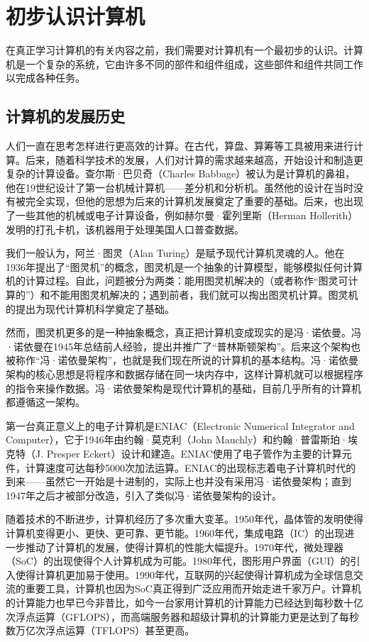 \chapter{初步认识计算机}

在真正学习计算机的有关内容之前，我们需要对计算机有一个最初步的认识。计算机是一个复杂的系统，它由许多不同的部件和组件组成，这些部件和组件共同工作以完成各种任务。

\section{计算机的发展历史}

人们一直在思考怎样进行更高效的计算。在古代，算盘、算筹等工具被用来进行计算。后来，随着科学技术的发展，人们对计算的需求越来越高，开始设计和制造更复杂的计算设备。查尔斯·巴贝奇（Charles Babbage）被认为是计算机的鼻祖，他在19世纪设计了第一台机械计算机——差分机和分析机。虽然他的设计在当时没有被完全实现，但他的思想为后来的计算机发展奠定了重要的基础。后来，也出现了一些其他的机械或电子计算设备，例如赫尔曼·霍列里斯（Herman Hollerith）发明的打孔卡机，该机器用于处理美国人口普查数据。

我们一般认为，阿兰·图灵（Alan Turing）是赋予现代计算机灵魂的人。他在1936年提出了“图灵机”的概念，图灵机是一个抽象的计算模型，能够模拟任何计算机的计算过程。自此，问题被分为两类：能用图灵机解决的（或者称作“图灵可计算的”）和不能用图灵机解决的；遇到前者，我们就可以掏出图灵机计算。图灵机的提出为现代计算机科学奠定了基础。

然而，图灵机更多的是一种抽象概念，真正把计算机变成现实的是冯·诺依曼。冯·诺依曼在1945年总结前人经验，提出并推广了“普林斯顿架构”。后来这个架构也被称作“冯·诺依曼架构”，也就是我们现在所说的计算机的基本结构。冯·诺依曼架构的核心思想是将程序和数据存储在同一块内存中，这样计算机就可以根据程序的指令来操作数据。冯·诺依曼架构是现代计算机的基础，目前几乎所有的计算机都遵循这一架构。

第一台真正意义上的电子计算机是ENIAC（Electronic Numerical Integrator and Computer），它于1946年由约翰·莫克利（John Mauchly）和约翰·普雷斯珀·埃克特（J. Presper Eckert）设计和建造。ENIAC使用了电子管作为主要的计算元件，计算速度可达每秒5000次加法运算。ENIAC的出现标志着电子计算机时代的到来——虽然它一开始是十进制的，实际上也并没有采用冯·诺依曼架构；直到1947年之后才被部分改造，引入了类似冯·诺依曼架构的设计。

随着技术的不断进步，计算机经历了多次重大变革。1950年代，晶体管的发明使得计算机变得更小、更快、更可靠、更节能。1960年代，集成电路（IC）的出现进一步推动了计算机的发展，使得计算机的性能大幅提升。1970年代，微处理器（SoC）的出现使得个人计算机成为可能。1980年代，图形用户界面（GUI）的引入使得计算机更加易于使用。1990年代，互联网的兴起使得计算机成为全球信息交流的重要工具，计算机也因为SoC真正得到广泛应用而开始走进千家万户。计算机的计算能力也早已今非昔比，如今一台家用计算机的计算能力已经达到每秒数十亿次浮点运算（GFLOPS），而高端服务器和超级计算机的计算能力更是达到了每秒数万亿次浮点运算（TFLOPS）甚至更高。

